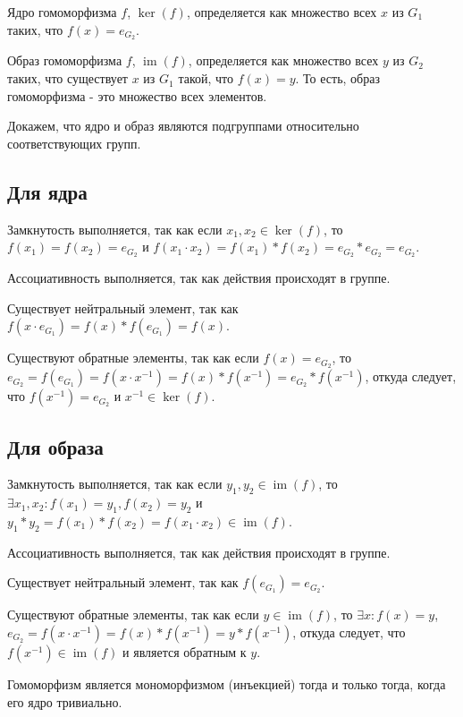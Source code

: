 \documentclass[12pt]{article}
\begin{document}
    Ядро гомоморфизма $f$, $\operatorname{ker}(f)$, определяется как множество всех $x$ из $G_1$ таких, что $f(x)=e_{G_2}$.

    Образ гомоморфизма $f$, $\operatorname{im}(f)$, определяется как множество всех $y$ из $G_2$ таких, что существует $x$ из $G_1$ такой, что $f(x)=y$. То есть, образ гомоморфизма - это множество всех элементов.

    Докажем, что ядро и образ являются подгруппами относительно соответствующих групп.

    \subsection{Для ядра}

    Замкнутость выполняется, так как если $x_1,x_2\in \operatorname{ker}(f)$, то \\ $f(x_1)=f(x_2)=e_{G_2}$ и $f(x_1\cdot x_2)=f(x_1)*f(x_2)=e_{G_2}*e_{G_2}=e_{G_2}$.

    Ассоциативность выполняется, так как действия происходят в группе.

    Существует нейтральный элемент, так как $f(x\cdot e_{G_1})=f(x)*f(e_{G_1})=f(x)$.

    Существуют обратные элементы, так как если $f(x)=e_{G_2}$, то $e_{G_2}=f(e_{G_1})=f(x\cdot x^{-1})=f(x)*f(x^{-1})=e_{G_2}*f(x^{-1})$, откуда следует, что $f(x^{-1})=e_{G_2}$ и $x^{-1}\in \operatorname{ker}(f)$.

    \subsection{Для образа}

    Замкнутость выполняется, так как если $y_1,y_2\in \operatorname{im}(f)$, то \\$\exists x_1,x_2:f(x_1)=y_1,f(x_2)=y_2$ и $y_1*y_2=f(x_1)*f(x_2)=f(x_1\cdot x_2)\in \operatorname{im}(f)$.

        Ассоциативность выполняется, так как действия происходят в группе.

        Существует нейтральный элемент, так как $f(e_{G_1})=e_{G_2}$.

        Существуют обратные элементы, так как если $y\in \operatorname{im}(f)$, то $\exists x:f(x)=y$, $e_{G_2}=f(x\cdot x^{-1})=f(x)*f(x^{-1})=y*f(x^{-1})$, откуда следует, что $f(x^{-1})\in \operatorname{im}(f)$ и является обратным к $y$.

        Гомоморфизм является мономорфизмом (инъекцией) тогда и только тогда, когда его ядро тривиально.
\end{document}
